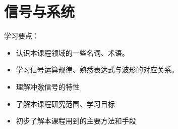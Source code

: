 \chapter{信号与系统}

学习要点：

\begin{itemize}
    \item 认识本课程领域的一些名词、术语。
    \item 学习信号运算规律、熟悉表达式与波形的对应关系。
    \item 理解冲激信号的特性
    \item 了解本课程研究范围、学习目标
    \item 初步了解本课程用到的主要方法和手段
\end{itemize}






